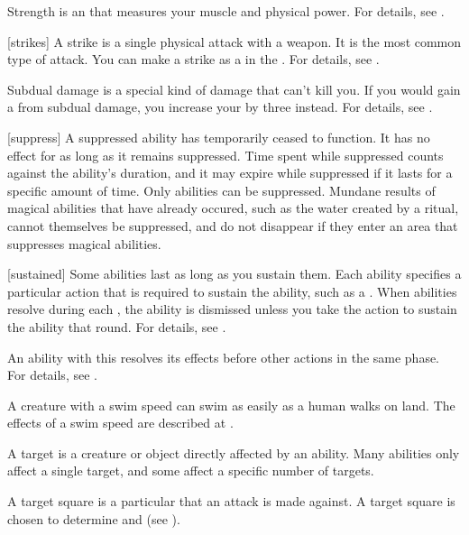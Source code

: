  Strength is an  that measures your muscle and physical power.
For details, see .

[strikes] A strike is a single physical attack with a weapon.
It is the most common type of attack.
You can make a strike as a  in the .
For details, see .

 Subdual damage is a special kind of damage that can't kill you.
If you would gain a  from subdual damage, you increase your  by three instead.
For details, see .

[suppress] A suppressed ability has temporarily ceased to function.
It has no effect for as long as it remains suppressed.
Time spent while suppressed counts against the ability's duration, and it may expire while suppressed if it lasts for a specific amount of time.
Only \magical abilities can be suppressed.
Mundane results of magical abilities that have already occured, such as the water created by a  ritual, cannot themselves be suppressed, and do not disappear if they enter an area that suppresses magical abilities.

[sustained] Some abilities last as long as you sustain them.
Each ability specifies a particular action that is required to sustain the ability, such as a .
When  abilities resolve during each , the ability is dismissed unless you take the action to sustain the ability that round.
For details, see .

 An ability with this  resolves its effects before other actions in the same phase.
For details, see .

 A creature with a swim speed can swim as easily as a human walks on land.
The effects of a swim speed are described at .

 A target is a creature or object directly affected by an ability.
Many abilities only affect a single target, and some affect a specific number of targets.

 A target square is a particular  that an attack is made against.
A target square is chosen to determine  and  (see ).


